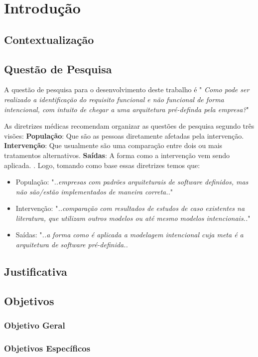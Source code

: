 \chapter{Introdução}

\section{Contextualização}

\section{Questão de Pesquisa}
A questão de pesquisa para o desenvolvimento deste trabalho é " \textit{Como pode ser realizado a identificação do requisito funcional e não funcional de forma intencional, com intuito de chegar a uma arquitetura pré-definda pela empresa?}"

As diretrizes médicas recomendam organizar as questões de pesquisa segundo três visões: \textbf{População}: Que são as pessoas diretamente afetadas pela intervenção. \textbf{Intervenção}: Que usualmente são uma comparação entre dois ou mais tratamentos alternativos. \textbf{Saídas}: A forma como a intervenção vem sendo aplicada. \cite{keele2007guidelines}. Logo, tomando como base essas diretrizes temos que: 

\begin{itemize}
	\item População: "\textit{..empresas com padrões arquiteturais de software definidos, mas não são/estão implementados de maneira correta..}"
	\item Intervenção: "\textit{..comparação com resultados de estudos de caso existentes na literatura, que utilizam outros modelos ou até mesmo modelos intencionais..}"
	\item Saídas: "\textit{..a forma como é aplicada a modelagem intencional cuja meta é a arquitetura de software pré-definida..}
\end{itemize}
\section{Justificativa}

\section{Objetivos}

\subsection{Objetivo Geral}

\subsection{Objetivos Específicos}

